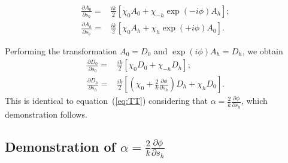 \documentclass[preprint]{iucr}              %
\begin{document}
\begin{subequations}
\begin{align}
\frac{\partial A_0}{\partial s_0} =& \frac{ik}{2} \left[ \chi_0 A_0+ \chi_{-h} \exp(-i\phi) A_h\right]; \nonumber \\
\frac{\partial A_h}{\partial s_h} =& \frac{ik}{2} \left[ \chi_0 A_h+ \chi_{h} \exp(+i\phi) A_0 \right]. \nonumber
\end{align}
\end{subequations}

Performing the transformation $A_0=D_0$ and $\exp(i\phi) A_h=D_h$, we obtain
\begin{subequations}
\begin{align}
\frac{\partial D_0}{\partial s_0} =& \frac{ik}{2} \left[ \chi_0 D_0+ \chi_{-h} D_h\right]; \\
\frac{\partial D_h}{\partial s_h} =& \frac{ik}{2} \left[ (\chi_0 + \frac{2}{k}\frac{\partial\phi}{\partial s_h} ) D_h+ \chi_{h} D_0\right].
\end{align}
\end{subequations}
This is identical to equation~(\ref{eq:TT}) considering that $\alpha=\frac{2}{k}\frac{\partial\phi}{\partial s_h}$, which demonstration follows.

\subsection{Demonstration of $\alpha=\frac{2}{k}\frac{\partial\phi}{\partial s_h}$ }
\end{document}
